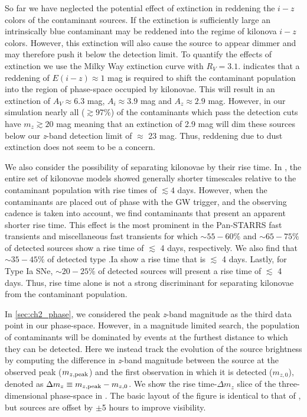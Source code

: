 \clearpage
So far we have neglected the potential effect of extinction in reddening the $i-z$ colors of the contaminant sources. If the extinction is sufficiently large an intrinsically blue contaminant may be reddened into the regime of kilonova $i-z$ colors. However, this extinction will also cause the source to appear dimmer and may therefore push it below the detection limit. To quantify the effects of extinction we use the Milky Way extinction curve with $R_V = 3.1$.  indicates that a reddening of $E(i-z) \approx 1$ mag is required to shift the contaminant population into the region of phase-space occupied by kilonovae. This will result in an extinction of $A_V \approx 6.3$ mag, $A_i \approx 3.9$ mag and $A_z \approx 2.9$ mag.  However, in our simulation nearly all ($\gtrsim 97\%$) of the contaminants which pass the detection cuts have $m_z \gtrsim 20$ mag meaning that an extinction of 2.9 mag will dim these sources below our {\em z}-band detection limit of $\approx$ 23 mag. Thus, reddening due to dust extinction does not seem to be a concern.

We also consider the possibility of separating kilonovae by their rise time. In , the entire set of kilonovae models showed generally shorter timescales relative to the contaminant population with rise times of $\lesssim4$ days. However, when the contaminants are placed out of phase with the GW trigger, and the observing cadence is taken into account, we find contaminants that present an apparent shorter rise time. This effect is the most prominent in the Pan-STARRS fast transients and miscellaneous fast transients for which $\sim55-60\%$ and $\sim65-75\%$ of detected sources show a rise time of $\lesssim$ 4 days, respectively. We also find that $\sim 35-45\%$ of detected type .Ia show a rise time that is $\lesssim$ 4 days. Lastly, for Type Ia SNe, $\sim20-25\%$ of detected sources will present a rise time of $\lesssim$ 4 days. Thus, rise time alone is not a strong discriminant for separating kilonovae from the contaminant population.

\clearpage
In \cref{sec:ch2_phase}, we considered the peak {\em z}-band magnitude as the third data point in our phase-space. However, in a magnitude limited search, the population of contaminants will be dominated by events at the furthest distance to which they can be detected. Here we instead track the evolution of the source brightness by computing the difference in {\em z}-band magnitude between the source at the observed peak ($m_{z,{\rm peak}}$) and the first observation in which it is detected ($m_{z,0}$), denoted as $\Delta m_z \equiv m_{z,{\rm peak}} - m_{z,0}$. We show the rise time-$\Delta m_z$ slice of the three-dimensional phase-space in . The basic layout of the figure is identical to that of , but sources are offset by $\pm$5 hours to improve visibility.

